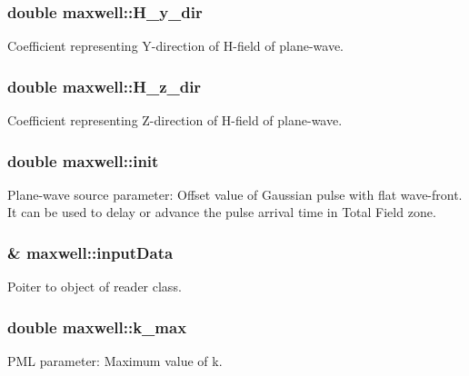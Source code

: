 \subsubsection[{\texorpdfstring{H\+\_\+y\+\_\+dir}{H_y_dir}}]{\setlength{\rightskip}{0pt plus 5cm}double maxwell\+::\+H\+\_\+y\+\_\+dir}\hypertarget{classmaxwell_a6f1cefe8572a9f1aa0df33734f88c183}{}\label{classmaxwell_a6f1cefe8572a9f1aa0df33734f88c183}
Coefficient representing Y-\/direction of H-\/field of plane-\/wave. 
\subsubsection[{\texorpdfstring{H\+\_\+z\+\_\+dir}{H_z_dir}}]{\setlength{\rightskip}{0pt plus 5cm}double maxwell\+::\+H\+\_\+z\+\_\+dir}\hypertarget{classmaxwell_a3595ede96fdacc0631c3690941138a5e}{}\label{classmaxwell_a3595ede96fdacc0631c3690941138a5e}
Coefficient representing Z-\/direction of H-\/field of plane-\/wave. 
\subsubsection[{\texorpdfstring{init}{init}}]{\setlength{\rightskip}{0pt plus 5cm}double maxwell\+::init}\hypertarget{classmaxwell_a549079ef29643a667585039522edba4a}{}\label{classmaxwell_a549079ef29643a667585039522edba4a}
Plane-\/wave source parameter\+: Offset value of Gaussian pulse with flat wave-\/front. It can be used to delay or advance the pulse arrival time in Total Field zone. 
\subsubsection[{\texorpdfstring{input\+Data}{inputData}}]{\& maxwell\+::input\+Data}\hypertarget{classmaxwell_a2f4ac38793fe9e80ec26448e631ba69d}{}\label{classmaxwell_a2f4ac38793fe9e80ec26448e631ba69d}
Poiter to object of reader class. 
\subsubsection[{\texorpdfstring{k\+\_\+max}{k_max}}]{\setlength{\rightskip}{0pt plus 5cm}double maxwell\+::k\+\_\+max}\hypertarget{classmaxwell_a77804475f8c95be8f44ddee6f0af0bfe}{}\label{classmaxwell_a77804475f8c95be8f44ddee6f0af0bfe}
P\+ML parameter\+: Maximum value of k. 
